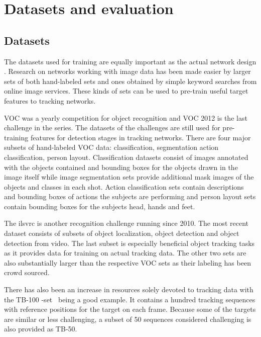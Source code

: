 \section{Datasets and evaluation}

\subsection{Datasets}
The datasets used for training are equally important as the actual network design
.
Research on networks working with image data has been made easier by larger sets of both
hand-labeled sets and ones obtained by simple keyword searches from online image services.
These kinds of sets can be used to pre-train useful target features to tracking networks.

VOC was a yearly competition for object recognition and VOC 2012 \cite{VOC12} is the last
challenge in the series. The datasets of the challenges are still used for pre-training
features for detection stages in tracking networks. There are four major subsets of
hand-labeled VOC data: classification, segmentation action classification, person layout.
Classification datasets consist of images annotated with the objects contained and bounding
boxes for the objects drawn in the image itself while image segmentation sets provide
additional mask images of the objects and classes in each shot. Action classification sets
contain descriptions and bounding boxes of actions the subjects are performing and person
layout sets contain bounding boxes for the subjects head, hands and feet.

The \ac{ilsvrc} \cite{ILSVRC15} is another recognition challenge running since 2010. The
most recent dataset consists of subsets of object localization, object detection and
object detection from video. The last subset is especially beneficial object tracking
tasks as it provides data for training on actual tracking data. The other two sets are also
substantially larger than the respective VOC sets as their labeling has been crowd sourced. 

There has also been an increase in resources solely devoted to tracking data with the
TB-100 -set~\cite{VTB} being a good example. It contains a hundred tracking sequences
with reference positions for the target on each frame. Because some of the targets are
similar or less challenging, a subset of 50 sequences considered challenging is also
provided as TB-50.~\cite{OT_BENCH}


